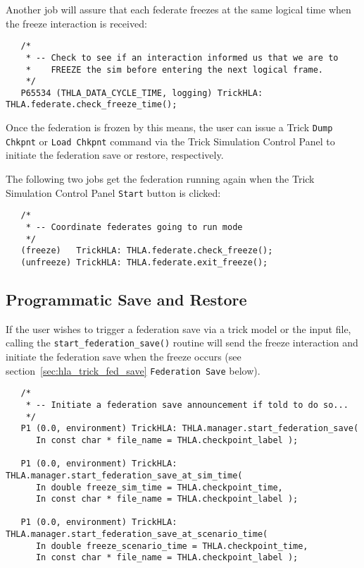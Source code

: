 Another job will assure that each federate freezes at the same logical time when the freeze interaction
is received:

\begin{verbatim}
   /*
    * -- Check to see if an interaction informed us that we are to
    *    FREEZE the sim before entering the next logical frame.
    */
   P65534 (THLA_DATA_CYCLE_TIME, logging) TrickHLA: THLA.federate.check_freeze_time();
\end{verbatim}

Once the federation is frozen by this means, the user can issue a Trick {\tt Dump Chkpnt} or {\tt Load Chkpnt} command
via the Trick Simulation Control Panel to initiate the federation save or restore, respectively.

The following two jobs get the federation running again when the Trick Simulation Control Panel {\tt Start} button is clicked:

\begin{verbatim}
   /*
    * -- Coordinate federates going to run mode
    */
   (freeze)   TrickHLA: THLA.federate.check_freeze();
   (unfreeze) TrickHLA: THLA.federate.exit_freeze();
\end{verbatim}

\subsection{Programmatic Save and Restore}
\label{sec:prog_save_and_restore}

If the user wishes to trigger a federation save via a trick model or the input file, calling the {\tt start\_federation\_save()}
routine will send the freeze interaction and initiate the federation save when the freeze occurs 
(see section~\ref{sec:hla_trick_fed_save} {\tt Federation Save} below).

\begin{verbatim}
   /*
    * -- Initiate a federation save announcement if told to do so...
    */
   P1 (0.0, environment) TrickHLA: THLA.manager.start_federation_save(
      In const char * file_name = THLA.checkpoint_label );

   P1 (0.0, environment) TrickHLA: THLA.manager.start_federation_save_at_sim_time(
      In double freeze_sim_time = THLA.checkpoint_time,
      In const char * file_name = THLA.checkpoint_label );

   P1 (0.0, environment) TrickHLA: THLA.manager.start_federation_save_at_scenario_time(
      In double freeze_scenario_time = THLA.checkpoint_time,
      In const char * file_name = THLA.checkpoint_label );
\end{verbatim}


